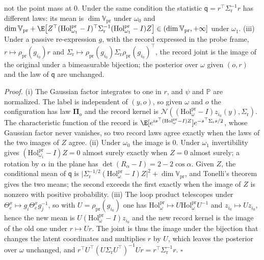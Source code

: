 not the point mass at $0$. Under the same condition the statistic $\mathsf q=r^\top\Sigma_{\mathrm r}^{-1}r$
has different laws: its mean is $\dim \mathbb V_{\mathrm{pr}}$ under $\omega_0$ and
$\dim \mathbb V_{\mathrm{pr}}+\E\bigl[Z^\top(\mathrm{Hol}^{\mathrm{pr}}_{\omega_1}-I)^\top\Sigma_{\mathrm r}^{-1}
(\mathrm{Hol}^{\mathrm{pr}}_{\omega_1}-I)Z\bigr]\in(\dim \mathbb V_{\mathrm{pr}},+\infty]$ under $\omega_1$. (iii)
Under a passive re-expression $g$, with the record expressed in the probe frame,
$r\mapsto\rho_{\mathrm{pr}}(g_{i_0})r$ and
$\Sigma_{\mathrm r}\mapsto\rho_{\mathrm{pr}}(g_{i_0})\Sigma_{\mathrm r}\rho_{\mathrm{pr}}(g_{i_0})^\top$, the
record joint is the image of the original under a bimeasurable bijection; the posterior over $\omega$ given
$(o,r)$ and the law of $\mathsf q$ are unchanged. 

\noindent\emph{Proof.}
(i) The Gaussian factor integrates to one in $r$, and $\psi$ and $\mathbb P$ are normalized. The label is
independent of $(y,o)$, so given $\omega$ and $o$ the configuration has law $\boldsymbol\Pi_o$ and the
record kernel is $\mathcal N((\mathrm{Hol}^{\mathrm{pr}}_\omega-I)z_{i_0}(y),\Sigma_{\mathrm r})$. The
characteristic function of the record is
$\E[e^{is^\top(\mathrm{Hol}^{\mathrm{pr}}_\omega-I)Z}]e^{-s^\top\Sigma_{\mathrm r}s/2}$, whose Gaussian factor
never vanishes, so two record laws agree exactly when the laws of the two images of $Z$ agree. (ii) Under
$\omega_0$ the image is $0$. Under $\omega_1$ invertibility gives
$(\mathrm{Hol}^{\mathrm{pr}}_{\omega_1}-I)Z=0$ almost surely exactly when $Z=0$ almost surely; a rotation by
$\alpha$ in the plane has $\det(R_\alpha-I)=2-2\cos\alpha$. Given $Z$, the conditional mean of $\mathsf q$ is
$\lvert\Sigma_{\mathrm r}^{-1/2}(\mathrm{Hol}^{\mathrm{pr}}_\omega-I)Z\rvert^2+\dim \mathbb V_{\mathrm{pr}}$, and
Tonelli's theorem gives the two means; the second exceeds the first exactly when the image of $Z$ is
nonzero with positive probability. (iii) The loop product telescopes under
$\Theta^x_e\mapsto g_i\Theta^x_eg_j^{-1}$, so with $U=\rho_{\mathrm{pr}}(g_{i_0})$ one has
$\mathrm{Hol}^{\mathrm{pr}}_\omega\mapsto U\mathrm{Hol}^{\mathrm{pr}}_\omega U^{-1}$ and
$z_{i_0}\mapsto Uz_{i_0}$, hence the new mean is $U(\mathrm{Hol}^{\mathrm{pr}}_\omega-I)z_{i_0}$ and the new
record kernel is the image of the old one under $r\mapsto Ur$. The joint is thus the image under the
bijection that changes the latent coordinates and multiplies $r$ by $U$, which leaves the posterior over
$\omega$ unchanged, and $r^\top U^\top(U\Sigma_{\mathrm r}U^\top)^{-1}Ur=r^\top\Sigma_{\mathrm r}^{-1}r$.
$\square$

